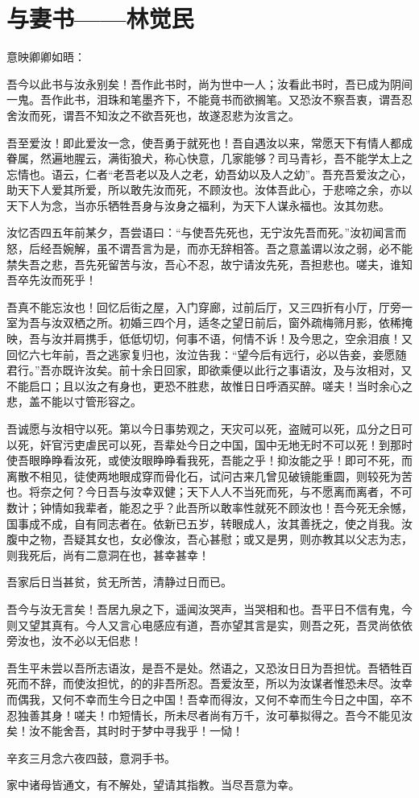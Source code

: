 \section{ 与妻书——林觉民}

意映卿卿如晤：

吾今以此书与汝永别矣！吾作此书时，尚为世中一人；汝看此书时，吾已成为阴间一鬼。吾作此书，泪珠和笔墨齐下，不能竟书而欲搁笔。又恐汝不察吾衷，谓吾忍舍汝而死，谓吾不知汝之不欲吾死也，故遂忍悲为汝言之。

吾至爱汝！即此爱汝一念，使吾勇于就死也！吾自遇汝以来，常愿天下有情人都成眷属，然遍地腥云，满街狼犬，称心快意，几家能够？司马青衫，吾不能学太上之忘情也。语云，仁者“老吾老以及人之老，幼吾幼以及人之幼”。吾充吾爱汝之心，助天下人爱其所爱，所以敢先汝而死，不顾汝也。汝体吾此心，于悲啼之余，亦以天下人为念，当亦乐牺牲吾身与汝身之福利，为天下人谋永福也。汝其勿悲。

汝忆否四五年前某夕，吾尝语曰：“与使吾先死也，无宁汝先吾而死。”汝初闻言而怒，后经吾婉解，虽不谓吾言为是，而亦无辞相答。吾之意盖谓以汝之弱，必不能禁失吾之悲，吾先死留苦与汝，吾心不忍，故宁请汝先死，吾担悲也。嗟夫，谁知吾卒先汝而死乎！

吾真不能忘汝也！回忆后街之屋，入门穿廊，过前后厅，又三四折有小厅，厅旁一室为吾与汝双栖之所。初婚三四个月，适冬之望日前后，窗外疏梅筛月影，依稀掩映，吾与汝并肩携手，低低切切，何事不语，何情不诉！及今思之，空余泪痕！又回忆六七年前，吾之逃家复归也，汝泣告我：“望今后有远行，必以告妾，妾愿随君行。”吾亦既许汝矣。前十余日回家，即欲乘便以此行之事语汝，及与汝相对，又不能启口；且以汝之有身也，更恐不胜悲，故惟日日呼酒买醉。嗟夫！当时余心之悲，盖不能以寸管形容之。

吾诚愿与汝相守以死。第以今日事势观之，天灾可以死，盗贼可以死，瓜分之日可以死，奸官污吏虐民可以死，吾辈处今日之中国，国中无地无时不可以死！到那时使吾眼睁睁看汝死，或使汝眼睁睁看我死，吾能之乎！抑汝能之乎！即可不死，而离散不相见，徒使两地眼成穿而骨化石，试问古来几曾见破镜能重圆，则较死为苦也。将奈之何？今日吾与汝幸双健；天下人人不当死而死，与不愿离而离者，不可数计；钟情如我辈者，能忍之乎？此吾所以敢率性就死不顾汝也！吾今死无余憾，国事成不成，自有同志者在。依新已五岁，转眼成人，汝其善抚之，使之肖我。汝腹中之物，吾疑其女也，女必像汝，吾心甚慰；或又是男，则亦教其以父志为志，则我死后，尚有二意洞在也，甚幸甚幸！

吾家后日当甚贫，贫无所苦，清静过日而已。

吾今与汝无言矣！吾居九泉之下，遥闻汝哭声，当哭相和也。吾平日不信有鬼，今则又望其真有。今人又言心电感应有道，吾亦望其言是实，则吾之死，吾灵尚依依旁汝也，汝不必以无侣悲！

吾生平未尝以吾所志语汝，是吾不是处。然语之，又恐汝日日为吾担忧。吾牺牲百死而不辞，而使汝担忧，的的非吾所忍。吾爱汝至，所以为汝谋者惟恐未尽。汝幸而偶我，又何不幸而生今日之中国！吾幸而得汝，又何不幸而生今日之中国，卒不忍独善其身！嗟夫！巾短情长，所未尽者尚有万千，汝可摹拟得之。吾今不能见汝矣！汝不能舍吾，其时时于梦中寻我乎！一恸！

辛亥三月念六夜四鼓，意洞手书。

家中诸母皆通文，有不解处，望请其指教。当尽吾意为幸。
